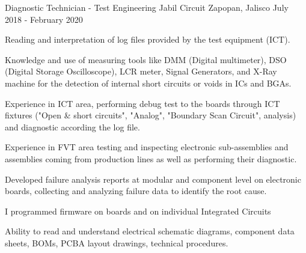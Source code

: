 


\begin{cventries}


\cventry
{Diagnostic Technician - Test Engineering} %
{Jabil Circuit} %
{Zapopan, Jalisco} %
{July 2018 - February 2020} %
{ %
\begin{cvitems}
\item {Reading and interpretation of log files provided by the test equipment (ICT).}
\item {Knowledge and use of measuring tools like DMM (Digital multimeter), DSO (Digital Storage Oscilloscope), LCR meter, Signal Generators, and X-Ray machine for the detection of internal short circuits or voids in ICs and BGAs.}
\item {Experience in ICT area, performing debug test to the boards through ICT fixtures ("Open \& short circuits", "Analog", "Boundary Scan Circuit", analysis) and diagnostic according the log file.}
\item {Experience in FVT area testing and inspecting electronic sub-assemblies and assemblies coming from production lines as well as performing their diagnostic.}
\item {Developed failure analysis reports at modular and component level on electronic boards, collecting and analyzing failure data to identify the root cause.}
\item {I programmed firmware on boards and on individual Integrated Circuits}
\item {Ability to read and understand electrical schematic diagrams, component data sheets, BOMs, PCBA layout drawings, technical procedures.}
\end{cvitems}
}



\end{cventries}
